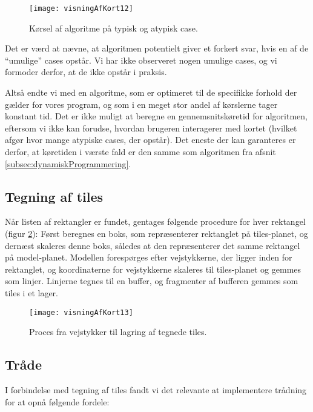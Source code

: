 \begin{figure}[h]
	\centering
	\texttt{[image: visningAfKort12]}
	\captionsetup{width=0.8\textwidth}
	\caption{Kørsel af algoritme på typisk og atypisk case.}
	\label{figur:visningAfKort12}
\end{figure}

Det er værd at nævne, at algoritmen potentielt giver et forkert svar, hvis en af de ``umulige'' cases opstår. Vi har ikke observeret nogen umulige cases, og vi formoder derfor, at de ikke opstår i praksis.

Altså endte vi med en algoritme, som er optimeret til de specifikke forhold der gælder for vores program, og som i en meget stor andel af kørslerne tager konstant tid. Det er ikke muligt at beregne en gennemsnitskøretid for algoritmen, eftersom vi ikke kan forudse, hvordan brugeren interagerer med kortet (hvilket afgør hvor mange atypiske cases, der opstår). Det eneste der kan garanteres er derfor, at køretiden i værste fald er den samme som algoritmen fra afsnit \ref{subsec:dynamiskProgrammering}.

\subsection{Tegning af tiles}
\label{subsec:tegningAfTiles}

Når listen af rektangler er fundet, gentages følgende procedure for hver rektangel (figur \ref{figur:visningAfKort13}): Først beregnes en boks, som repræsenterer rektanglet på tiles-planet, og dernæst skaleres denne boks, således at den repræsenterer det samme rektangel på model-planet. Modellen forespørges efter vejstykkerne, der ligger inden for rektanglet, og koordinaterne for vejstykkerne skaleres til tiles-planet og gemmes som linjer. Linjerne tegnes til en buffer, og fragmenter af bufferen gemmes som tiles i et lager.

\begin{figure}[h]
	\centering
	\texttt{[image: visningAfKort13]}
	\captionsetup{width=0.8\textwidth}
	\caption{Proces fra vejstykker til lagring af tegnede tiles.}
	\label{figur:visningAfKort13}
\end{figure}

\subsection{Tråde}
\label{subsec:traade}

I forbindelse med tegning af tiles fandt vi det relevante at implementere trådning for at opnå følgende fordele:


